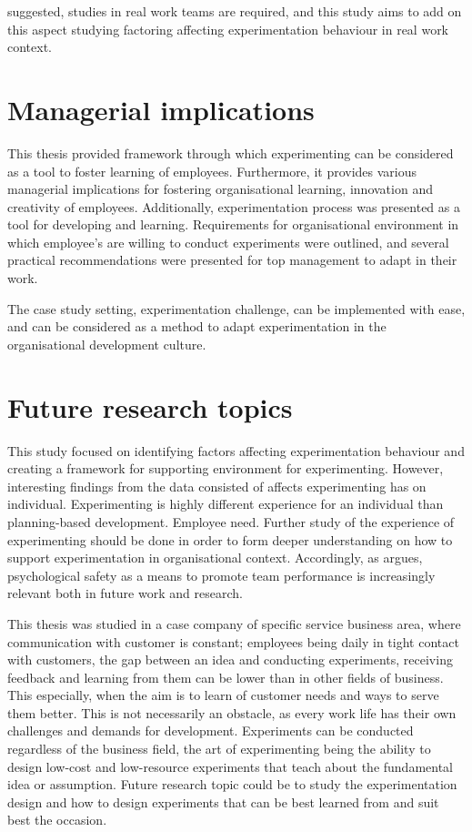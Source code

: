\citet{edmondson1999psychological} suggested, studies in real work teams are required, and this study aims to add on this aspect studying factoring affecting experimentation behaviour in real work context. 

\section{Managerial implications}
This thesis provided framework through which experimenting can be considered as a tool to foster learning of employees. Furthermore, it provides various managerial implications for fostering organisational learning, innovation and creativity of employees. Additionally, experimentation process was presented as a tool for developing and learning. Requirements for organisational environment in which employee's are willing to conduct experiments were outlined, and several practical recommendations were presented for top management to adapt in their work.

The case study setting, experimentation challenge, can be implemented with ease, and can be considered as a method to adapt experimentation in the organisational development culture. 

\section{Future research topics}
This study focused on identifying factors affecting experimentation behaviour and creating a framework for supporting environment for experimenting. However, interesting findings from the data consisted of affects experimenting has on individual. Experimenting is highly different experience for an individual than planning-based development. Employee need. Further study of the experience of experimenting should be done in order to form deeper understanding on how to support experimentation in organisational context. Accordingly, as \citet{edmondson1999psychological} argues, psychological safety as a means to promote team performance is increasingly relevant both in future work and research. 

This thesis was studied in a case company of specific service business area, where communication with customer is constant; employees being daily in tight contact with customers, the gap between an idea and conducting experiments, receiving feedback and learning from them can be lower than in other fields of business. This especially, when the aim is to learn of customer needs and ways to serve them better. This is not necessarily an obstacle, as every work life has their own challenges and demands for development. Experiments can be conducted regardless of the business field, the art of experimenting being the ability to design low-cost and low-resource experiments that teach about the fundamental idea or assumption. Future research topic could be to study the experimentation design and how to design experiments that can be best learned from and suit best the occasion. 

